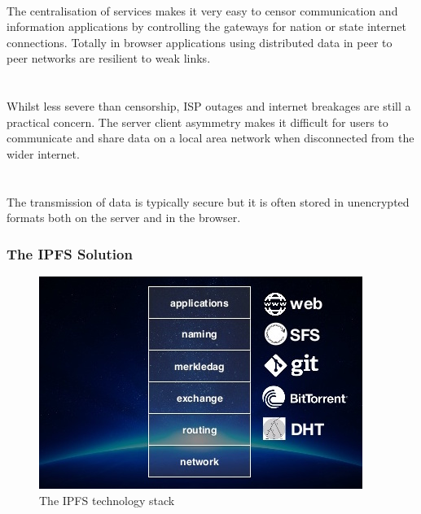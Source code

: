\\
The centralisation of services makes it very easy to censor communication and information applications by controlling the gateways for nation or state internet connections. Totally in browser applications using distributed data in peer to peer networks are resilient to weak links.\\
\\
\\
Whilst less severe than censorship, ISP outages and internet breakages are still a practical concern. The server client asymmetry makes it difficult for users to communicate and share data on a local area network when disconnected from the wider internet. \\
\\
\\
The transmission of data is typically secure but it is often stored in unencrypted formats both on the server and in the browser. \\

\subsubsection{The IPFS Solution}
\begin{figure}
\centering
\includegraphics[width=\textwidth]{Figures/IpfsStack}
\decoRule
\caption[]{The IPFS technology stack}
\label{fig:IpfsStack}
\end{figure}

